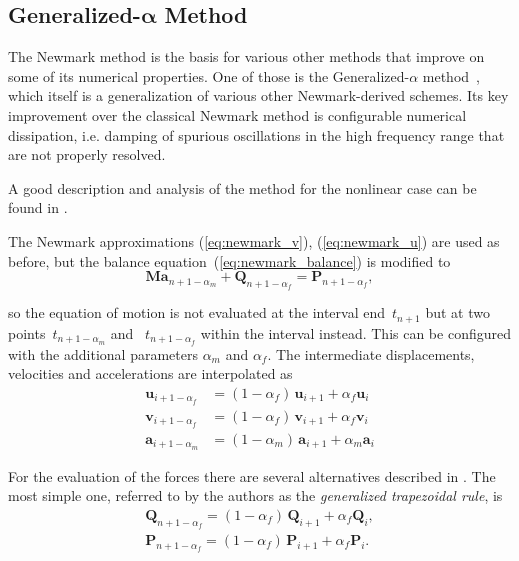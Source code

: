 \subsection{Generalized-$\boldsymbol{\alpha}$ Method}

The Newmark method is the basis for various other methods that improve on some of its numerical properties.
One of those is the Generalized-$\alpha$ method~\cite{bib:chung1993}, which itself is a generalization of various other Newmark-derived schemes.
Its key improvement over the classical Newmark method is configurable numerical dissipation, i.e. damping of spurious oscillations in the high frequency range that are not properly resolved.

A good description and analysis of the method for the nonlinear case can be found in \cite{bib:erlicher2002}.

The Newmark approximations (\ref{eq:newmark_v}), (\ref{eq:newmark_u}) are used as before, but the balance equation~(\ref{eq:newmark_balance}) is modified to
%
\begin{equation}
\boldsymbol{M}\boldsymbol{a}_{n+1-\alpha_m} + \boldsymbol{Q}_{n+1-\alpha_f} = \boldsymbol{P}_{n+1-\alpha_f},
\end{equation}

so the equation of motion is not evaluated at the interval end~$t_{n+1}$ but at two points~$t_{n+1-\alpha_m}$ and~ $t_{n+1-\alpha_f}$ within the interval instead.
This can be configured with the additional parameters $\alpha_{m}$ and $\alpha_{f}$.
The intermediate displacements, velocities and accelerations are interpolated as
%
\begin{align}
\boldsymbol{u}_{i+1-\alpha_f} &= (1 - \alpha_f)\,\boldsymbol{u}_{i+1} + \alpha_f\boldsymbol{u}_{i} \\
\mathbf{v}_{i+1-\alpha_f} &= (1 - \alpha_f)\,\mathbf{v}_{i+1} + \alpha_f\mathbf{v}_{i} \\
\boldsymbol{a}_{i+1-\alpha_m} &= (1 - \alpha_m)\,\boldsymbol{a}_{i+1} + \alpha_m\boldsymbol{a}_{i}
\end{align}

For the evaluation of the forces there are several alternatives described in \cite{bib:erlicher2002}.
The most simple one, referred to by the authors as the \textit{generalized trapezoidal rule}, is
%
\begin{align}
\boldsymbol{Q}_{n+1-\alpha_f} =  (1 - \alpha_f)\,\boldsymbol{Q}_{i+1} + \alpha_f\boldsymbol{Q}_{i}, \\
\boldsymbol{P}_{n+1-\alpha_f} =  (1 - \alpha_f)\,\boldsymbol{P}_{i+1} + \alpha_f\boldsymbol{P}_{i}.
\end{align}

